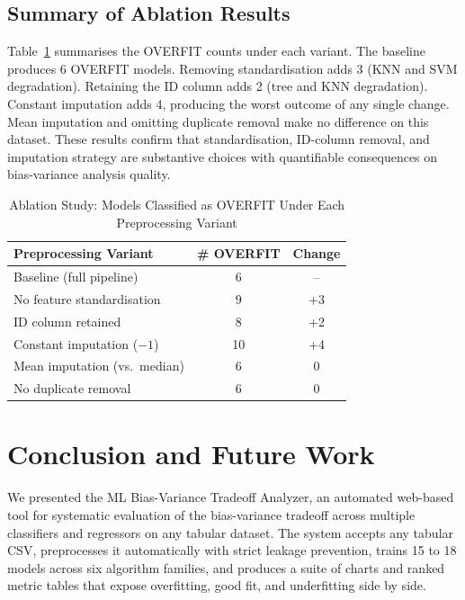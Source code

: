 \documentclass[conference]{IEEEtran}
\begin{document}
\subsection{Summary of Ablation Results}

Table~\ref{tab:ablation} summarises the OVERFIT counts under each variant. The baseline produces 6 OVERFIT models. Removing standardisation adds 3 (KNN and SVM degradation). Retaining the ID column adds 2 (tree and KNN degradation). Constant imputation adds 4, producing the worst outcome of any single change. Mean imputation and omitting duplicate removal make no difference on this dataset. These results confirm that standardisation, ID-column removal, and imputation strategy are substantive choices with quantifiable consequences on bias-variance analysis quality.

\begin{table}[t]
    \caption{Ablation Study: Models Classified as OVERFIT Under Each Preprocessing Variant}
    \label{tab:ablation}
    \centering
    \small
    \renewcommand{\arraystretch}{1.3}
    \begin{tabular}{|>{\raggedright\arraybackslash}p{1.6in}|c|c|}
    \hline
    \textbf{Preprocessing Variant} & \textbf{\# OVERFIT} & \textbf{Change} \\
    \hline
    Baseline (full pipeline)        & 6  & -- \\
    \hline
    No feature standardisation      & 9  & +3 \\
    \hline
    ID column retained              & 8  & +2 \\
    \hline
    Constant imputation ($-1$)      & 10 & +4 \\
    \hline
    Mean imputation (vs.\ median)   & 6  & 0 \\
    \hline
    No duplicate removal            & 6  & 0 \\
    \hline
    \end{tabular}
\end{table}

\section{Conclusion and Future Work}

We presented the ML Bias-Variance Tradeoff Analyzer, an automated web-based tool for systematic evaluation of the bias-variance tradeoff across multiple classifiers and regressors on any tabular dataset. The system accepts any tabular CSV, preprocesses it automatically with strict leakage prevention, trains 15 to 18 models across six algorithm families, and produces a suite of charts and ranked metric tables that expose overfitting, good fit, and underfitting side by side.
\end{document}
